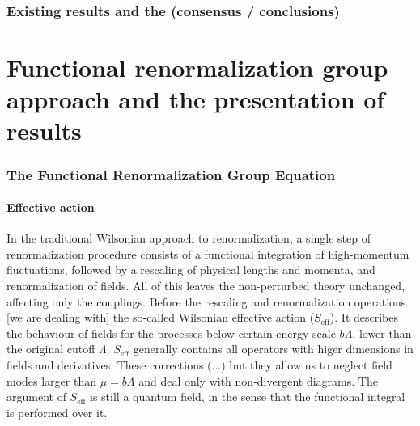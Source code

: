 \documentclass[11pt, a4paper]{article}
\begin{document}
\section{Existing results and the (consensus / conclusions)}

\part{Functional renormalization group approach and the presentation of results}

\section{The Functional Renormalization Group Equation}

\subsection*{\centering Effective action}

In the traditional Wilsonian approach to renormalization, a single step of renormalization procedure consists of
a functional integration of high-momentum fluctuations, followed by a rescaling of physical lengths and momenta, and
renormalization of fields. All of this leaves the non-perturbed theory unchanged, affecting only the couplings.
Before the rescaling and renormalization operations [we are dealing with] the so-called Wilsonian effective action ($S_{\text{eff}}$).
It describes the behaviour of fields for the processes below certain energy scale $b\Lambda$, lower than the original cutoff $\Lambda$.
$S_{\text{eff}}$ generally contains all operators with higer dimensions in fields and derivatives.
These corrections (...) but they allow us to neglect field modes larger than $\mu = b\Lambda$ and deal only with non-divergent diagrams.
The argument of $S_{\text{eff}}$ is still a quantum field, in the sense that the functional integral is performed over it. %
\end{document}
